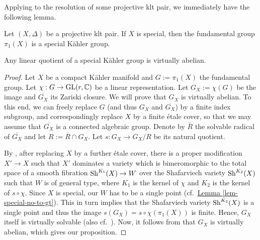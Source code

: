 Applying \cite{Tak03} to the resolution of some projective klt pair, we immediately have the following lemma.
\begin{lemme}\label{lem-special-klt}
Let $(X,\Delta)$ be a projective klt pair.
If $X$ is special, then the fundamental group $\pi_1(X)$ is a special K\"ahler group.
\end{lemme}


\begin{prop}\label{prop-special-Kahler-abe}
Any linear quotient of a special K\"ahler group is virtually abelian.
\end{prop}




\begin{proof}%
Let $X$ be a compact K\"ahler manifold and $G:=\pi_1(X)$ the fundamental group.
Let $\chi:G\to \textup{GL}(r,\mathbb{C})$ be a linear representation.
Let $G_X:=\chi(G)$ be the image and $\overline{G_X}$ its Zariski closure. 
We will prove that $G_X$ is virtually abelian. To this end, we can freely replace $G$ (and thus $G_X$ and $\overline{G_X}$) by a finite index subgroup, and correspondingly replace $X$ by a finite \'etale cover, 
so that we may assume that $\overline{G_X}$ is a connected algebraic group.
Denote by $\overline{R}$ the solvable radical of $\overline{G_X}$ and let $R:=\overline{R}\cap G_X$.
Let $s:G_X\to G_X/R$ be its natural quotient.

By \cite[Th\'eor\`eme 6.5 and its proof]{CCE15}, after replacing $X$ by a further  \'etale cover, there is a proper modification $X'\to X$ such that $X'$ dominates a variety  which is bimeromorphic to the total space of a smooth fibration $\textup{Sh}^{K_1}(X)\to W$ over the Shafarviech variety $\textup{Sh}^{K_2}(X)$ such that  $W$ is of general type, where $K_1$ is the kernel of $\chi$ and $K_2$ is the kernel of $s\circ\chi$. 
Since $X$ is special, our $W$ has to be a single point (cf.~{\hyperref[lem-special-no-to-gt]{Lemma  \ref*{lem-special-no-to-gt}}}).
This in turn implies that the Shafarviech variety $\textup{Sh}^{K_2}(X)$  is a single point and thus the image $s(G_X)=s\circ\chi(\pi_1(X))$ is finite.
Hence, $G_X$ itself is virtually solvable (also cf.~\cite[Th\'eor\`eme 6.3]{CCE15}).
Now, it follows from \cite[Corollaire 4.2]{CCE15} that $G_X$ is virtually abelian, which gives our proposition.
\end{proof}



